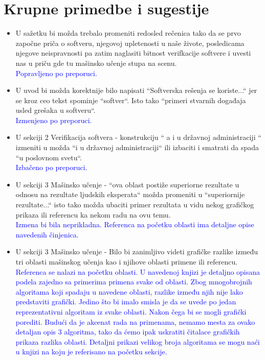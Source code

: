 \documentclass[a4paper]{report}
\newcommand{\odgovor}[1]{\textcolor{blue}{#1}}
\begin{document}
\section{Krupne primedbe i sugestije}
\begin{itemize}
  \item U sažetku bi možda trebalo promeniti redosled rečenica tako da se prvo započne priča o softveru, njegovoj upletenosti u naše živote, posledicama njegove neispravnosti pa zatim naglasiti bitnost verifkacije softvere i uvesti nas u priču gde tu mašinsko učenje stupa na scenu.
  \\\odgovor{Popravljeno po preporuci.}

  \item U uvod bi možda korektnije bilo napisati ``Softverska rešenja se koriste...`` jer se kroz ceo tekst spominje ``softver``. Isto tako ``primeri stvarnih događaja usled grešaka u softveru``.
  \\\odgovor{Izmenjeno po preporuci.}

  \item U sekciji 2 Verifikacija softvera - konstrukciju `` a i u državnoj administraciji `` izmeniti u možda ``i u državnoj administraciji`` ili izbaciti i smatrati da spada ``u poslovnom svetu``.
  \\\odgovor{Izbačeno po preporuci.}

  \item U sekciji 3 Mašinsko učenje - ``ova oblast postiže superiorne rezultate  u odnosu na rezultate ljudskih eksperata`` možda promeniti u ``superiornije rezultate...`` isto tako možda ubaciti primer rezultata u vidu nekog grafičkog prikaza ili referencu ka nekom radu na ovu temu.
  \\\odgovor{Izmena bi bila neprikladna. Referenca na početku oblasti ima detaljne opise navedenih činjenica.}

  \item U sekciji 3 Mašinsko učenje - Bilo bi zanimljivo videti grafičke razlike između tri oblasti mašinskog učenja kao i njihove oblasti primene ili referencu.
  \\\odgovor{Referenca se nalazi na početku oblasti. U navedenoj knjizi je detaljno opisana podela zajedno sa primerima primena svake od oblasti. Zbog mnogobrojnih algoritama koji spadaju u navedene oblasti, razlike između njih nije lako predstaviti grafički. Jedino što bi imalo smisla je da se uvede po jedan reprezentativni algoritam iz svake oblasti. Nakon čega bi se mogli grafički porediti. Budući da je akcenat rada na primenama, nemamo mesta za ovako detaljan opis 3 algoritma, tako da ćemo ipak uskratiti čitalace grafičkih prikaza razlika oblasti. Detaljni prikazi velikog broja algoritama se mogu naći u knjizi na koju je referisano na početku sekcije. }


\end{itemize}
\end{document}

